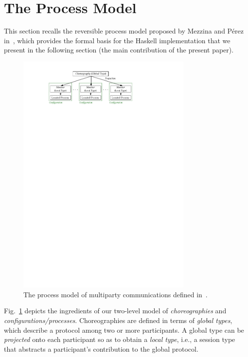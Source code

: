 \documentclass[runningheads]{llncs}
\begin{document}
\section{The Process Model}

This section recalls the reversible process model proposed by Mezzina and P\'{e}rez in~\cite{DBLP:conf/ppdp/MezzinaP17}, which provides the formal basis for the Haskell implementation that we present in the following section (the main contribution of the present paper).

\begin{figure}[!t]
\begin{center}
    \includegraphics[width=8.7cm]{./img/figmodel.pdf}
\end{center}
\vspace{-4mm}
\caption{The process model of multiparty communications defined in~\cite{DBLP:conf/ppdp/MezzinaP17}.}\label{f:model}
\vspace{-4mm}
\end{figure}
Fig.~\ref{f:model} depicts the ingredients of our
two-level model of \emph{choreographies} and \emph{configurations/processes}.
Choreographies are defined in terms of \emph{global types}, which describe a protocol among two or more participants. 
A global type can be \emph{projected} onto each participant so as to obtain 
a \emph{local type}, i.e., a session type that abstracts a participant's contribution to the global protocol. 
\end{document}
